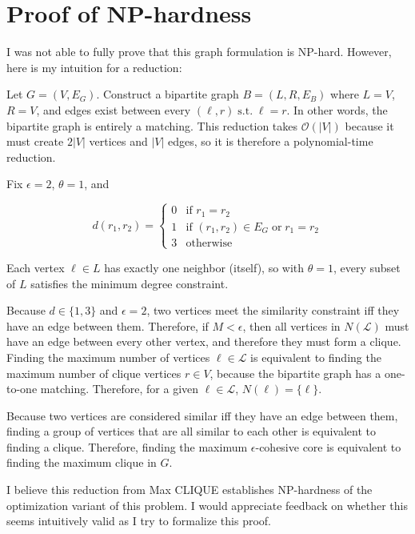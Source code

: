 \section{Proof of NP-hardness}

I was not able to fully prove that this graph formulation is NP-hard. However, here is my intuition for a reduction:

Let $G = (V, E_G)$. Construct a bipartite graph $B = (L, R, E_B)$ where $L = V$, $R = V$, and edges exist between every $(\ell, r) \mathrel{\text{s.t.}} \ell = r$. In other words, the bipartite graph is entirely a matching. This reduction takes $\mathcal{O}(|V|)$ because it must create $2|V|$ vertices and $|V|$ edges, so it is therefore a polynomial-time reduction.

Fix $\epsilon = 2$, $\theta = 1$, and

\begin{equation}
d(r_1, r_2) = 
\begin{cases}
    0 & \text{if } r_1 = r_2 \\
    1 & \text{if } (r_1, r_2) \in E_G \mathrel{\text{or}} r_1 = r_2 \\
    3 & \text{otherwise}
\end{cases}
\end{equation}

Each vertex $\ell \in L$ has exactly one neighbor (itself), so with $\theta = 1$, every subset of $L$ satisfies the minimum degree constraint.

Because $d \in \{1, 3\}$ and $\epsilon = 2$, two vertices meet the similarity constraint iff they have an edge between them. Therefore, if $M < \epsilon$, then all vertices in $N(\mathcal{L})$ must have an edge between every other vertex, and therefore they must form a clique. Finding the maximum number of vertices $\ell \in \mathcal{L}$ is equivalent to finding the maximum number of clique vertices $r \in V$, because the bipartite graph has a one-to-one matching. Therefore, for a given $\ell \in \mathcal{L}$, $N(\ell) = \{\ell\}$.

Because two vertices are considered similar iff they have an edge between them, finding a group of vertices that are all similar to each other is equivalent to finding a clique. Therefore, finding the maximum $\epsilon$-cohesive core is equivalent to finding the maximum clique in $G$.

I believe this reduction from Max CLIQUE establishes NP-hardness of the optimization variant of this problem. I would appreciate feedback on whether this seems intuitively valid as I try to formalize this proof.


